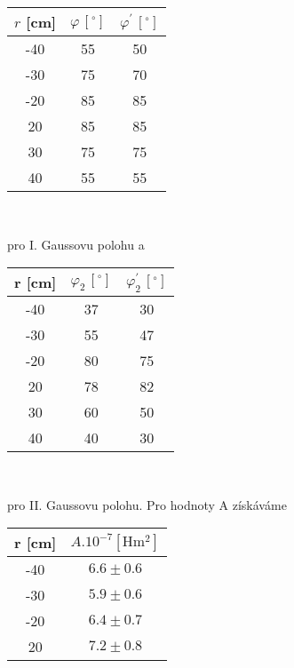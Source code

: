\documentclass[czech,11pt,a4paper]{article}
\begin{document}
\begin{multicols}{2}
	\begin{center}
		\begin{tabular}{|c|c|c|}
		\hline
		$r$ [cm] & $\varphi\, [^\circ]$ & $\varphi ^\prime\, [^\circ]$ \\ \hline
		-40    & 55        & 50                \\ \hline
		-30    & 75        & 70                \\ \hline
		-20    & 85        & 85                \\ \hline
		20     & 85        & 85                \\ \hline
		30     & 75        & 75                \\ \hline
		40     & 55        & 55                \\ \hline
	\end{tabular}\\
	\end{center}
	pro I. Gaussovu polohu a \\
\begin{center}
		\begin{tabular}{|c|c|c|}
		\hline
		r [cm] & $\varphi_2\, [^\circ]$ & $\varphi_2 ^\prime\, [^\circ]$ \\ \hline
		-40    & 37        & 30                \\ \hline
		-30    & 55        & 47                \\ \hline
		-20    & 80        & 75                \\ \hline
		20     & 78        & 82                \\ \hline
		30     & 60        & 50                \\ \hline
		40     & 40        & 30                \\ \hline
	\end{tabular}\\
\end{center}
	pro II. Gaussovu polohu.
	Pro hodnoty A získáváme
	\begin{center}
		\begin{tabular}{|c|c|}
		\hline
		r [cm] & $A . 10^{-7}[\mathrm{Hm^2}]$ \\ \hline
		-40    &$ 6.6  \pm 0.6 $                     \\ \hline
		-30    &$ 5.9 \pm    0.6    $                 \\ \hline
		-20    &$ 6.4 \pm       0.7    $              \\ \hline
		20     &$ 7.2 \pm    0.8      $               \\ \hline

\end{tabular}
\end{center}
\end{multicols}
\end{document}
